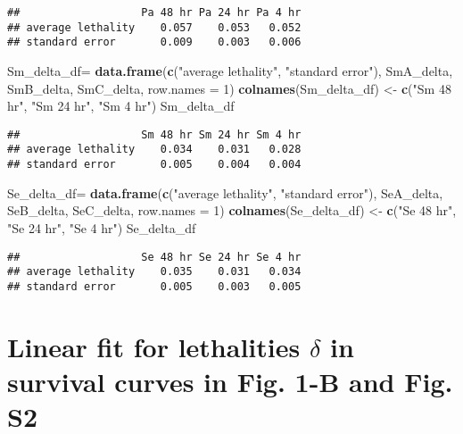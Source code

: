 \documentclass[]{article}
\newenvironment{Shaded}{\begin{snugshade}}{\end{snugshade}}
\newcommand{\KeywordTok}[1]{\textcolor[rgb]{0.13,0.29,0.53}{\textbf{#1}}}
\newcommand{\DataTypeTok}[1]{\textcolor[rgb]{0.13,0.29,0.53}{#1}}
\newcommand{\DecValTok}[1]{\textcolor[rgb]{0.00,0.00,0.81}{#1}}
\newcommand{\StringTok}[1]{\textcolor[rgb]{0.31,0.60,0.02}{#1}}
\newcommand{\NormalTok}[1]{#1}
\begin{document}
\begin{verbatim}
##                   Pa 48 hr Pa 24 hr Pa 4 hr
## average lethality    0.057    0.053   0.052
## standard error       0.009    0.003   0.006
\end{verbatim}

\begin{Shaded}
\begin{Highlighting}[]
\NormalTok{Sm_delta_df=}\StringTok{ }\KeywordTok{data.frame}\NormalTok{(}\KeywordTok{c}\NormalTok{(}\StringTok{"average lethality"}\NormalTok{, }\StringTok{"standard error"}\NormalTok{), SmA_delta, SmB_delta, SmC_delta, }\DataTypeTok{row.names =} \DecValTok{1}\NormalTok{)}
\KeywordTok{colnames}\NormalTok{(Sm_delta_df) <-}\StringTok{ }\KeywordTok{c}\NormalTok{(}\StringTok{"Sm 48 hr"}\NormalTok{, }\StringTok{"Sm 24 hr"}\NormalTok{, }\StringTok{"Sm 4 hr"}\NormalTok{)}
\NormalTok{Sm_delta_df}
\end{Highlighting}
\end{Shaded}

\begin{verbatim}
##                   Sm 48 hr Sm 24 hr Sm 4 hr
## average lethality    0.034    0.031   0.028
## standard error       0.005    0.004   0.004
\end{verbatim}

\begin{Shaded}
\begin{Highlighting}[]
\NormalTok{Se_delta_df=}\StringTok{ }\KeywordTok{data.frame}\NormalTok{(}\KeywordTok{c}\NormalTok{(}\StringTok{"average lethality"}\NormalTok{, }\StringTok{"standard error"}\NormalTok{), SeA_delta, SeB_delta, SeC_delta, }\DataTypeTok{row.names =} \DecValTok{1}\NormalTok{)}
\KeywordTok{colnames}\NormalTok{(Se_delta_df) <-}\StringTok{ }\KeywordTok{c}\NormalTok{(}\StringTok{"Se 48 hr"}\NormalTok{, }\StringTok{"Se 24 hr"}\NormalTok{, }\StringTok{"Se 4 hr"}\NormalTok{)}
\NormalTok{Se_delta_df}
\end{Highlighting}
\end{Shaded}

\begin{verbatim}
##                   Se 48 hr Se 24 hr Se 4 hr
## average lethality    0.035    0.031   0.034
## standard error       0.005    0.003   0.005
\end{verbatim}

\section{\texorpdfstring{Linear fit for lethalities \(\delta\) in
survival curves in Fig. 1-B and Fig.
S2}{Linear fit for lethalities \textbackslash{}delta in survival curves in Fig. 1-B and Fig. S2}}\label{linear-fit-for-lethalities-delta-in-survival-curves-in-fig.-1-b-and-fig.-s2}
\end{document}
